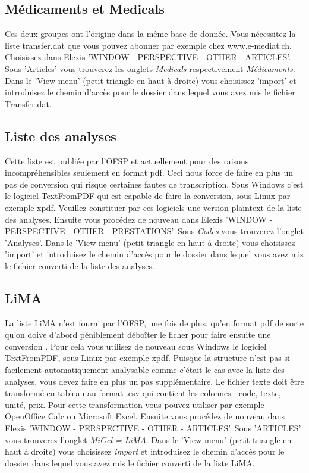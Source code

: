 \subsection{Médicaments et Medicals}
Ces deux groupes ont l'origine dans la même base de donnée. Vous nécessitez la liste transfer.dat que vous pouvez abonner par exemple chez www.e-mediat.ch. Choisissez dans Elexis 'WINDOW - PERSPECTIVE - OTHER - ARTICLES'. Sous 'Articles' vous trouverez les onglets \textit{Medicals} respectivement \textit{Médicaments}. Dans le 'View-menu' (petit triangle en haut  à droite) vous choisissez 'import' et introduisez le chemin d'accès pour le dossier dans lequel vous avez mis le fichier Transfer.dat.

\subsection{Liste des analyses}
Cette liste est publiée par l'OFSP et actuellement pour des raisons incompréhensibles seulement en format pdf. Ceci nous force de faire en plus un pas de conversion qui risque certaines fautes de transcription. Sous Windows c'est le logiciel TextFromPDF qui est capable de faire la conversion, sous Linux par exemple xpdf. Veuillez constituer par ces logiciels une version plaintext de la liste des analyses. Ensuite vous procédez de nouveau dans Elexis 'WINDOW - PERSPECTIVE - OTHER - PRESTATIONS'. Sous \textit{Codes} vous trouverez l'onglet 'Analyses'. Dans le 'View-menu' (petit triangle en haut à droite) vous choisissez 'import' et introduisez le chemin d'accès pour le dossier dans lequel vous avez mis le fichier converti de la liste des analyses.
\subsection{LiMA}
La liste LiMA n'est fourni par l'OFSP, une fois de plus, qu'en format pdf de sorte qu'on doive d'abord péniblement déboîter le ficher pour faire ensuite une conversion . Pour cela vous utilisez de nouveau sous Windows le logiciel TextFromPDF, sous Linux par exemple xpdf. Puisque la structure n'est pas si facilement automatiquement analysable comme c'était le cas avec la liste des analyses, vous devez faire en plus un pas supplémentaire. Le fichier texte doit être transformé en tableau au format .csv qui contient les colonnes : code, texte, unité, prix. Pour cette transformation vous pouvez utiliser par exemple OpenOffice Calc ou Microsoft Excel. Ensuite vous procédez de nouveau dans Elexis 'WINDOW - PERSPECTIVE - OTHER - ARTICLES'. Sous 'ARTICLES' vous trouverez l'onglet \textit {MiGel = LiMA}. Dans le 'View-menu' (petit triangle en haut à droite) vous choisissez \textit{import} et introduisez le chemin d'accès pour le dossier dans lequel vous avez mis le fichier converti de la liste LiMA.

